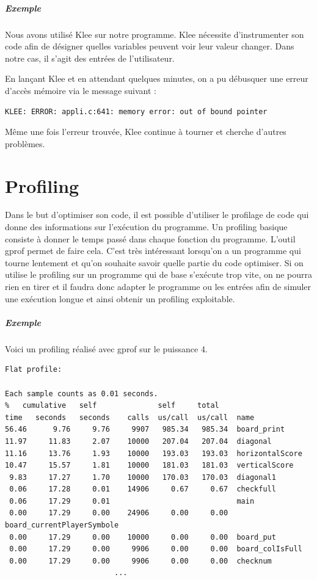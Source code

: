 \documentclass{report}
\begin{document}
\paragraph{Exemple}
Nous avons utilisé Klee sur notre programme. Klee nécessite d'instrumenter son code afin de désigner quelles variables peuvent voir leur valeur changer. Dans notre cas, il s'agit des entrées de l'utilisateur.

En lançant Klee et en attendant quelques minutes, on a pu débusquer une erreur d'accès mémoire via le message suivant :
\begin{scriptsize}
  \begin{lstlisting}
KLEE: ERROR: appli.c:641: memory error: out of bound pointer
  \end{lstlisting}
\end{scriptsize}

Même une fois l'erreur trouvée, Klee continue à tourner et cherche d'autres problèmes.

\chapter{Profiling}
Dans le but d'optimiser son code, il est possible d'utiliser le profilage de code qui donne des informations sur l'exécution du programme.  Un profiling basique consiste à donner le temps passé dans chaque fonction du programme. L'outil gprof permet de faire cela. C'est très intéressant lorsqu'on a un programme qui tourne lentement et qu'on souhaite savoir quelle partie du code optimiser. Si on utilise le profiling sur un programme qui de base s'exécute trop vite, on ne pourra rien en tirer et il faudra donc adapter le programme ou les entrées afin de simuler une exécution longue et ainsi obtenir un profiling exploitable.
\paragraph{Exemple}
Voici un profiling réalisé avec gprof sur le puissance 4.
\begin{scriptsize}
\begin{lstlisting}
Flat profile:

Each sample counts as 0.01 seconds.
%   cumulative   self              self     total           
time   seconds   seconds    calls  us/call  us/call  name    
56.46      9.76     9.76     9907   985.34   985.34  board_print
11.97     11.83     2.07    10000   207.04   207.04  diagonal
11.16     13.76     1.93    10000   193.03   193.03  horizontalScore
10.47     15.57     1.81    10000   181.03   181.03  verticalScore
 9.83     17.27     1.70    10000   170.03   170.03  diagonal1
 0.06     17.28     0.01    14906     0.67     0.67  checkfull
 0.06     17.29     0.01                             main
 0.00     17.29     0.00    24906     0.00     0.00  board_currentPlayerSymbole
 0.00     17.29     0.00    10000     0.00     0.00  board_put
 0.00     17.29     0.00     9906     0.00     0.00  board_colIsFull
 0.00     17.29     0.00     9906     0.00     0.00  checknum
                         ...
\end{lstlisting}
\end{scriptsize}
\end{document}
